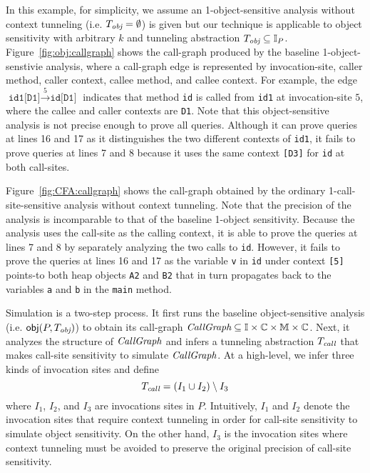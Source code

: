 In this example, for simplicity, we assume an 1-object-sensitive analysis
without context tunneling (i.e. $T_{\text{\it obj}} = \emptyset$) is given but our technique is applicable
to object sensitivity with arbitrary $k$ and tunneling abstraction $T_{\text{\it obj}} \subseteq \mathbb{I}_P$. 
Figure~\ref{fig:obj:callgraph} shows the call-graph produced by the
baseline 1-object-senstivie analysis, 
where a call-graph edge is represented by invocation-site, caller method, caller context, 
callee method, and callee context. For example, the edge
$\texttt{id1[D1]} \stackrel{5}{\to} \texttt{id[D1]}$ indicates that
method {\tt id} is called from {\tt id1} at invocation-site $5$,
where the callee and caller contexts are {\tt D1}.  Note that
this object-sensitive analysis is not precise enough to prove all queries.
Although it can prove queries at lines 16 and
17 as it distinguishes the two different contexts of {\tt id1}, it
fails to prove queries at lines 7 and 8 because it uses the same
context {\tt [D3]} for {\tt id} at both call-sites.





Figure~\ref{fig:CFA:callgraph} shows the call-graph obtained by the
ordinary 1-call-site-sensitive analysis without context tunneling. 
Note that the precision of the analysis is incomparable to
that of the baseline 1-object sensitivity. 
Because the analysis uses the
call-site as the calling context, it is able to prove
the queries at
lines 7 and 8 by separately analyzing the two calls to \texttt{id}. However,
it fails to prove the queries at lines
16 and 17 as the variable {\tt v} in \texttt{id} under context
\texttt{[5]} points-to both heap objects \texttt{A2} and \texttt{B2}
that in turn
propagates back to the variables {\tt a} and {\tt b} in the
\texttt{main} method.




Simulation is a two-step process. 
It first runs the baseline object-sensitive analysis 
(i.e. ${\sf obj}(P, T_{\text{\it obj}})$) 
to obtain its
call-graph $\textit{CallGraph} \subseteq \mathbb{I} \times \mathbb{C} \times \mathbb{M}
\times \mathbb{C}$.
Next, it analyzes the structure of $\textit{CallGraph}$ and infers a tunneling abstraction
$T_{\text{\it call}}$ that makes call-site sensitivity to simulate $\textit{CallGraph}$. 
At a high-level, we infer three kinds of invocation sites and define
\[
T_{\text{\it call}} = (I_1 \cup I_2) \setminus I_3
\]
where $I_1$, $I_2$, and $I_3$ are invocations sites in $P$.
Intuitively, $I_1$ and $I_2$ denote the invocation sites
that require context tunneling in order for call-site sensitivity to simulate
object sensitivity. On the other hand, $I_3$ is the invocation sites
where context tunneling must be avoided to preserve the original
precision of call-site sensitivity. %


